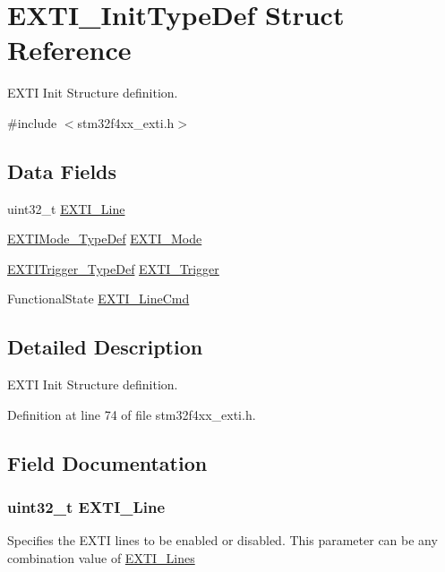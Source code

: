 \hypertarget{struct_e_x_t_i___init_type_def}{\section{E\-X\-T\-I\-\_\-\-Init\-Type\-Def Struct Reference}
\label{struct_e_x_t_i___init_type_def}
}


E\-X\-T\-I Init Structure definition.  




{\ttfamily \#include $<$stm32f4xx\-\_\-exti.\-h$>$}

\subsection*{Data Fields}
\begin{DoxyCompactItemize}
\item 
uint32\-\_\-t \hyperlink{struct_e_x_t_i___init_type_def_aef528a7c9a2804cc7672755c91e5b0e1}{E\-X\-T\-I\-\_\-\-Line}
\item 
\hyperlink{group___e_x_t_i_gad5e69af98dc0dfdf64417adc1cf57929}{E\-X\-T\-I\-Mode\-\_\-\-Type\-Def} \hyperlink{struct_e_x_t_i___init_type_def_abea50256cdb09a2a84fc8f104611b867}{E\-X\-T\-I\-\_\-\-Mode}
\item 
\hyperlink{group___e_x_t_i_ga9da190f5425d1b421a06bced8cc48e9b}{E\-X\-T\-I\-Trigger\-\_\-\-Type\-Def} \hyperlink{struct_e_x_t_i___init_type_def_ab60cf7701e280ca910eff8c618590ec5}{E\-X\-T\-I\-\_\-\-Trigger}
\item 
Functional\-State \hyperlink{struct_e_x_t_i___init_type_def_a5a4f12d56819fcfdd25f973adbbca045}{E\-X\-T\-I\-\_\-\-Line\-Cmd}
\end{DoxyCompactItemize}


\subsection{Detailed Description}
E\-X\-T\-I Init Structure definition. 

Definition at line 74 of file stm32f4xx\-\_\-exti.\-h.



\subsection{Field Documentation}
\hypertarget{struct_e_x_t_i___init_type_def_aef528a7c9a2804cc7672755c91e5b0e1}{
\subsubsection[{E\-X\-T\-I\-\_\-\-Line}]{\setlength{\rightskip}{0pt plus 5cm}uint32\-\_\-t E\-X\-T\-I\-\_\-\-Line}}\label{struct_e_x_t_i___init_type_def_aef528a7c9a2804cc7672755c91e5b0e1}
Specifies the E\-X\-T\-I lines to be enabled or disabled. This parameter can be any combination value of \hyperlink{group___e_x_t_i___lines}{E\-X\-T\-I\-\_\-\-Lines} 

